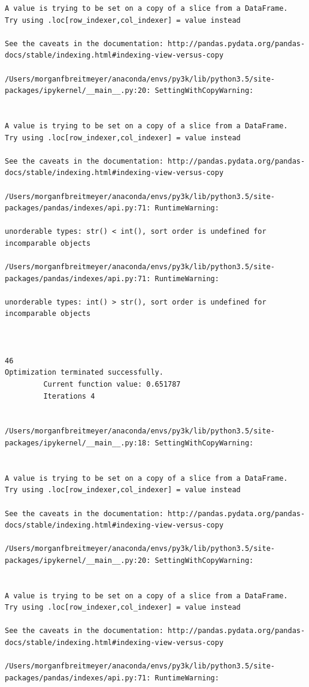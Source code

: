\begin{lstlisting}
A value is trying to be set on a copy of a slice from a DataFrame.
Try using .loc[row_indexer,col_indexer] = value instead

See the caveats in the documentation: http://pandas.pydata.org/pandas-docs/stable/indexing.html#indexing-view-versus-copy

/Users/morganfbreitmeyer/anaconda/envs/py3k/lib/python3.5/site-packages/ipykernel/__main__.py:20: SettingWithCopyWarning:


A value is trying to be set on a copy of a slice from a DataFrame.
Try using .loc[row_indexer,col_indexer] = value instead

See the caveats in the documentation: http://pandas.pydata.org/pandas-docs/stable/indexing.html#indexing-view-versus-copy

/Users/morganfbreitmeyer/anaconda/envs/py3k/lib/python3.5/site-packages/pandas/indexes/api.py:71: RuntimeWarning:

unorderable types: str() < int(), sort order is undefined for incomparable objects

/Users/morganfbreitmeyer/anaconda/envs/py3k/lib/python3.5/site-packages/pandas/indexes/api.py:71: RuntimeWarning:

unorderable types: int() > str(), sort order is undefined for incomparable objects



46
Optimization terminated successfully.
         Current function value: 0.651787
         Iterations 4


/Users/morganfbreitmeyer/anaconda/envs/py3k/lib/python3.5/site-packages/ipykernel/__main__.py:18: SettingWithCopyWarning:


A value is trying to be set on a copy of a slice from a DataFrame.
Try using .loc[row_indexer,col_indexer] = value instead

See the caveats in the documentation: http://pandas.pydata.org/pandas-docs/stable/indexing.html#indexing-view-versus-copy

/Users/morganfbreitmeyer/anaconda/envs/py3k/lib/python3.5/site-packages/ipykernel/__main__.py:20: SettingWithCopyWarning:


A value is trying to be set on a copy of a slice from a DataFrame.
Try using .loc[row_indexer,col_indexer] = value instead

See the caveats in the documentation: http://pandas.pydata.org/pandas-docs/stable/indexing.html#indexing-view-versus-copy

/Users/morganfbreitmeyer/anaconda/envs/py3k/lib/python3.5/site-packages/pandas/indexes/api.py:71: RuntimeWarning:


\end{lstlisting}
